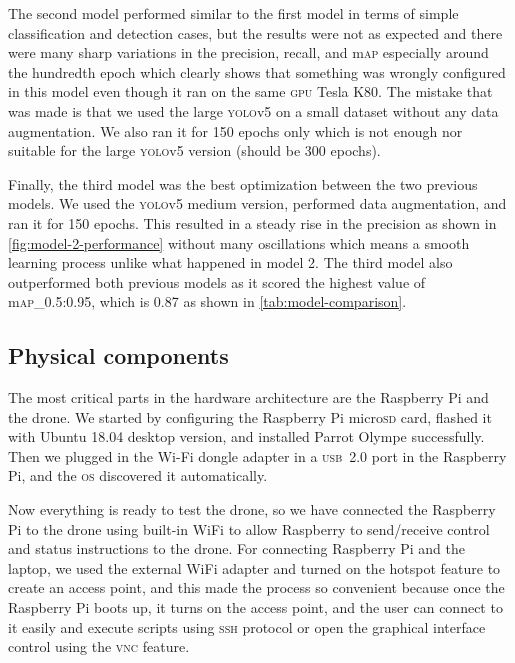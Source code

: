 \documentclass[../main.tex]{subfiles}
\begin{document}
The second model performed similar to the first model in terms of simple 
classification and detection cases, but the results were not as expected and there 
were many sharp variations in the precision, recall, and m\textsc{ap} especially around the 
hundredth epoch which clearly shows that something was wrongly configured in this model
even though it ran on the same \textsc{gpu} Tesla K80.
The mistake that was made is that we used the large \textsc{yolo}v5 on a small dataset
without any data augmentation. We also ran it for 150 epochs only which is not enough nor 
suitable for the large \textsc{yolo}v5 version (should be 300 epochs).

Finally, the third model was the best optimization between the two previous models. 
We used the \textsc{yolo}v5 medium version, performed data augmentation, and ran it for
150 epochs. This resulted in a steady rise in the precision as shown in 
\cref{fig:model-2-performance} without many oscillations which means a smooth learning
process unlike what happened in model 2. 
The third model also outperformed both previous models as it scored the highest value 
of m\textsc{ap}\_0.5:0.95, which is 0.87 as shown in \cref{tab:model-comparison}. 

\subsection{Physical components}

The most critical parts in the hardware
architecture are the Raspberry Pi and the drone. 
We started by configuring the Raspberry Pi micro\textsc{sd} card,
flashed it with Ubuntu 18.04 desktop version,
and installed Parrot Olympe successfully. 
Then we plugged in the Wi-Fi dongle adapter
in a \textsc{usb}~2.0 port in the Raspberry Pi, 
and the \textsc{os} discovered it automatically. 

Now everything is ready to test the 
\anafi drone, so we have connected the
Raspberry Pi to the drone using built-in WiFi
to allow Raspberry to send/receive control and status 
instructions to the drone. 
For connecting Raspberry Pi and the laptop, 
we used the external WiFi adapter and turned 
on the hotspot feature to create an access point,
and this made the process so convenient because 
once the Raspberry Pi boots up, it turns on the 
access point, and the user can connect to it 
easily and execute scripts using \textsc{ssh} 
protocol or open the graphical interface 
control using the \textsc{vnc} feature.
\end{document}
